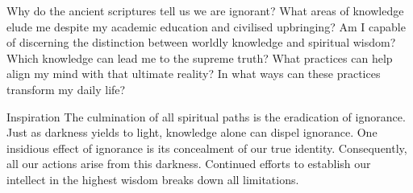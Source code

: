 
\newpage
\begin{mananam}{} 
\mananamtext Why do the ancient scriptures tell us we are ignorant? What areas of knowledge elude me despite my academic education and civilised upbringing? Am I capable of discerning the distinction between worldly knowledge and spiritual wisdom? Which knowledge can lead me to the supreme truth? What practices can help align my mind with that ultimate reality? In what ways can these practices transform my daily life? 
\end{mananam}
\WritingHand{}
\begin{inspiration}{\mananamfont Inspiration}
\mananamtext The culmination of all spiritual paths is the eradication of ignorance. Just as darkness yields to light, knowledge alone can dispel ignorance. One insidious effect of ignorance is its concealment of our true identity. Consequently, all our actions arise from this darkness. Continued efforts to establish our intellect in the highest wisdom breaks down all limitations.
\end{inspiration}
\newpage



